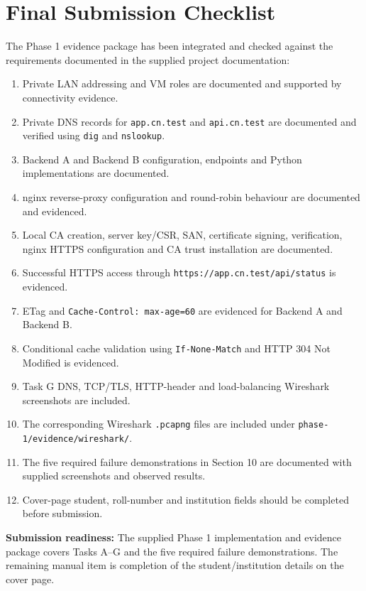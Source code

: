 \documentclass[12pt,a4paper]{article}
\newcommand{\statusbox}[2]{%
\begin{tcolorbox}[colback=lightgray,colframe=bordergray,boxrule=0.5pt]
\textbf{#1:} #2
\end{tcolorbox}}
\begin{document}
\section{Final Submission Checklist}
The Phase 1 evidence package has been integrated and checked against the requirements documented in the supplied project documentation:
\begin{enumerate}
  \item Private LAN addressing and VM roles are documented and supported by connectivity evidence.
  \item Private DNS records for \texttt{app.cn.test} and \texttt{api.cn.test} are documented and verified using \texttt{dig} and \texttt{nslookup}.
  \item Backend A and Backend B configuration, endpoints and Python implementations are documented.
  \item nginx reverse-proxy configuration and round-robin behaviour are documented and evidenced.
  \item Local CA creation, server key/CSR, SAN, certificate signing, verification, nginx HTTPS configuration and CA trust installation are documented.
  \item Successful HTTPS access through \texttt{https://app.cn.test/api/status} is evidenced.
  \item ETag and \texttt{Cache-Control: max-age=60} are evidenced for Backend A and Backend B.
  \item Conditional cache validation using \texttt{If-None-Match} and HTTP 304 Not Modified is evidenced.
  \item Task G DNS, TCP/TLS, HTTP-header and load-balancing Wireshark screenshots are included.
  \item The corresponding Wireshark \texttt{.pcapng} files are included under \texttt{phase-1/evidence/wireshark/}.
  \item The five required failure demonstrations in Section 10 are documented with supplied screenshots and observed results.
  \item Cover-page student, roll-number and institution fields should be completed before submission.
\end{enumerate}

\statusbox{Submission readiness}{The supplied Phase 1 implementation and evidence package covers Tasks A--G and the five required failure demonstrations. The remaining manual item is completion of the student/institution details on the cover page.}
\end{document}
